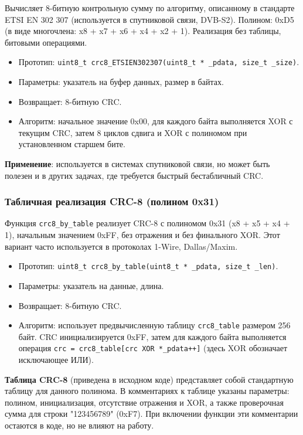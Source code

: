 \documentclass[a4paper,12pt]{article}
\begin{document}
Вычисляет 8-битную контрольную сумму по алгоритму, описанному в стандарте ETSI EN 302 307 (используется в спутниковой связи, DVB-S2). Полином: 0xD5 (в виде многочлена: x8 + x7 + x6 + x4 + x2 + 1). Реализация без таблицы, битовыми операциями.

\begin{itemize}
    \item Прототип: \texttt{uint8\_t crc8\_ETSIEN302307(uint8\_t * \_pdata, size\_t \_size)}.
    \item Параметры: указатель на буфер данных, размер в байтах.
    \item Возвращает: 8-битную CRC.
    \item Алгоритм: начальное значение 0x00, для каждого байта выполняется XOR с текущим CRC, затем 8 циклов сдвига и XOR с полиномом при установленном старшем бите.
\end{itemize}

\textbf{Применение}: используется в системах спутниковой связи, но может быть полезен и в других задачах, где требуется быстрый бестабличный CRC.

\subsubsection{Табличная реализация CRC-8 (полином 0x31)}

Функция \texttt{crc8\_by\_table} реализует CRC-8 с полиномом 0x31 (x8 + x5 + x4 + 1), начальным значением 0xFF, без отражения и без финального XOR. Этот вариант часто используется в протоколах 1-Wire, Dallas/Maxim.

\begin{itemize}
    \item Прототип: \texttt{uint8\_t crc8\_by\_table(uint8\_t * \_pdata, size\_t \_len)}.
    \item Параметры: указатель на данные, длина.
    \item Возвращает: 8-битную CRC.
    \item Алгоритм: использует предвычисленную таблицу \texttt{crc8\_table} размером 256 байт. CRC инициализируется 0xFF, затем для каждого байта выполняется операция \texttt{crc = crc8\_table[crc XOR *\_pdata++]} (здесь XOR обозначает исключающее ИЛИ).
\end{itemize}

\textbf{Таблица CRC-8} (приведена в исходном коде) представляет собой стандартную таблицу для данного полинома. В комментариях к таблице указаны параметры: полином, инициализация, отсутствие отражения и XOR, а также проверочная сумма для строки "123456789" (0xF7). При включении функции эти комментарии остаются в коде, но не влияют на работу.
\end{document}

